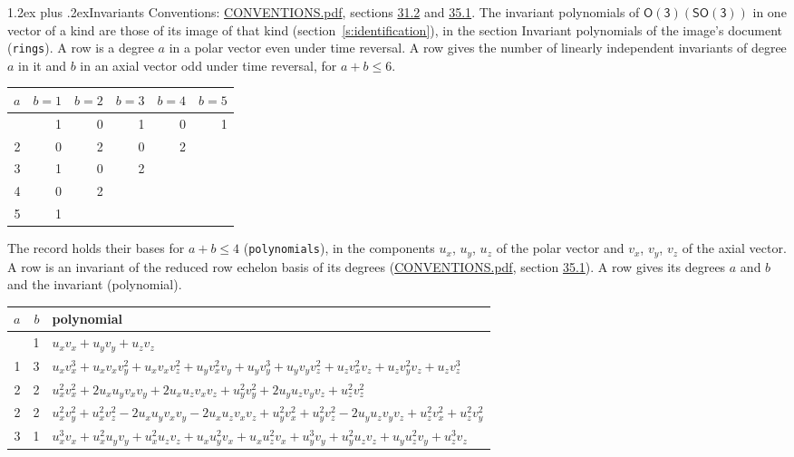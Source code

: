 \documentclass[10pt,a4paper]{article}
\makeatletter
\renewcommand\section{\@startsection{section}{1}{\z@}{-3ex plus -1ex minus -.2ex}%
  {1.2ex plus .2ex}{\normalfont\large\sffamily\bfseries\color{parttitle}}}
\numberwithin{equation}{section}
\newcommand{\grp}[1]{\mathsf{#1}}
\makeatother
\begin{document}
\section{Invariants}\label{s:invariants}
Conventions: \href{../../CONVENTIONS.pdf}{CONVENTIONS.pdf}, sections \href{../../CONVENTIONS.pdf\#conv.31.2}{31.2} and \href{../../CONVENTIONS.pdf\#conv.35.1}{35.1}.
The invariant polynomials of $\grp{O(3)}(\grp{SO(3)})$ in one vector of a kind are those of its image of that kind (section~\ref{s:identification}), in the section Invariant polynomials of the image's document (\texttt{rings}).
\leavevmode\label{n:index.degree.polar}\label{n:index.degree.axial}A row is a degree $a$ in a polar vector even under time reversal. A row gives the number of linearly independent invariants of degree $a$ in it and $b$ in an axial vector odd under time reversal, for $a + b \le 6$.
{\small\begin{longtable}{@{}rrrrrr@{}}\toprule
$a$ & $b = 1$ & $b = 2$ & $b = 3$ & $b = 4$ & $b = 5$\\\midrule\endhead
\bottomrule\endfoot\endlastfoot
1 & 1 & 0 & 1 & 0 & 1\\*
2 & 0 & 2 & 0 & 2 & \\*
3 & 1 & 0 & 2 &  & \\*
4 & 0 & 2 &  &  & \\*
5 & 1 &  &  &  & \\
\bottomrule\end{longtable}}
\leavevmode\label{n:local.component.polar}\label{n:local.component.axial}The record holds their bases for $a + b \le 4$ (\texttt{polynomials}), in the components $u_{x}$, $u_{y}$, $u_{z}$ of the polar vector and $v_{x}$, $v_{y}$, $v_{z}$ of the axial vector. \label{n:head.polynomial}A row is an invariant of the reduced row echelon basis of its degrees (\href{../../CONVENTIONS.pdf}{CONVENTIONS.pdf}, section \href{../../CONVENTIONS.pdf\#conv.35.1}{35.1}). A row gives its degrees $a$ and $b$ and the invariant (polynomial).
{\small\renewcommand{\arraystretch}{1.2}\begin{longtable}{@{}rrl@{}}\toprule
$a$ & $b$ & polynomial\\\midrule\endhead
\bottomrule\endfoot\endlastfoot
1 & 1 & $u_{x}v_{x} + u_{y}v_{y} + u_{z}v_{z}$\\*
1 & 3 & $u_{x}v_{x}^{3} + u_{x}v_{x}v_{y}^{2} + u_{x}v_{x}v_{z}^{2} + u_{y}v_{x}^{2}v_{y} + u_{y}v_{y}^{3} + u_{y}v_{y}v_{z}^{2} + u_{z}v_{x}^{2}v_{z} + u_{z}v_{y}^{2}v_{z} + u_{z}v_{z}^{3}$\\*
2 & 2 & $u_{x}^{2}v_{x}^{2} + 2u_{x}u_{y}v_{x}v_{y} + 2u_{x}u_{z}v_{x}v_{z} + u_{y}^{2}v_{y}^{2} + 2u_{y}u_{z}v_{y}v_{z} + u_{z}^{2}v_{z}^{2}$\\*
2 & 2 & $u_{x}^{2}v_{y}^{2} + u_{x}^{2}v_{z}^{2} - 2u_{x}u_{y}v_{x}v_{y} - 2u_{x}u_{z}v_{x}v_{z} + u_{y}^{2}v_{x}^{2} + u_{y}^{2}v_{z}^{2} - 2u_{y}u_{z}v_{y}v_{z} + u_{z}^{2}v_{x}^{2} + u_{z}^{2}v_{y}^{2}$\\*
3 & 1 & $u_{x}^{3}v_{x} + u_{x}^{2}u_{y}v_{y} + u_{x}^{2}u_{z}v_{z} + u_{x}u_{y}^{2}v_{x} + u_{x}u_{z}^{2}v_{x} + u_{y}^{3}v_{y} + u_{y}^{2}u_{z}v_{z} + u_{y}u_{z}^{2}v_{y} + u_{z}^{3}v_{z}$\\
\bottomrule\end{longtable}}
\end{document}
